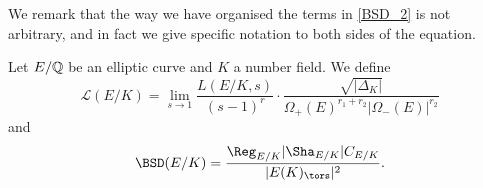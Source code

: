 
We remark that the way we have organised the terms in \eqref{BSD_2} is not arbitrary, and in fact we give specific notation to both sides of the equation. 

\begin{notation}
    Let $E/\mathbb{Q}$ be an elliptic curve and $K$ a number field. We define 
    $$\mathcal{L}(E/K)=\lim_{s\to1}\frac{L(E/K,s)}{(s-1)^r}\cdot\frac{\sqrt{|\Delta_K|}}{\Omega_+(E)^{r_1+r_2}|\Omega_-(E)|^{r_2}}$$
    and
    $$\BSD(E/K)=\frac{\Reg_{E/K}|\Sha_{E/K}|C_{E/K}}{|E(K)_{\tors}|^2}.$$
\end{notation}


